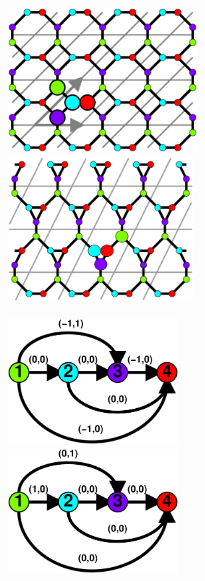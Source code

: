\documentclass{beamer}
\begin{document}
\begin{frame}
  \begin{minipage}{2in}
     \begin{center}
         \includegraphics[height=1.5in]{periodic3a}\\
         \includegraphics[height=1.5in]{periodic5a}\\
     \end{center}
  \end{minipage}
  \begin{minipage}{1.8in}
     \begin{center}
       \includegraphics[height=1.3in]{periodic4b}\\
       \includegraphics[height=1.3in]{periodic5b}\\
     \end{center}
  \end{minipage}
\end{frame}
\end{document}

